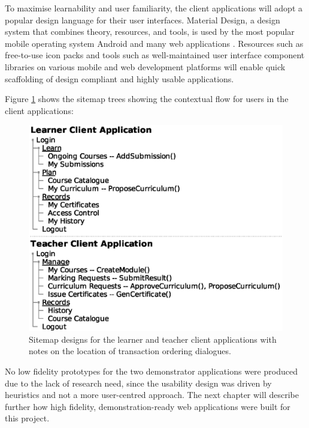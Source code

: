 To maximise learnability and user familiarity, the client applications will adopt a popular design language for their user interfaces.
Material Design, a design system that combines theory, resources, and tools, is used by the most popular mobile operating system Android
and many web applications \citep{google2018material}. Resources such as free-to-use icon packs and tools such as well-maintained
user interface component libraries on various mobile and web development platforms will enable quick scaffolding of design compliant and
highly usable applications.

Figure \ref{fig:sitemaps} shows the sitemap trees showing the contextual flow for users in the client applications:

\begin{figure}[!ht]
	\centering
	\includegraphics[width=.75\textwidth]{sitemaps}
	\caption[Client Application Sitemaps]
	{Sitemap designs for the learner and teacher client applications with notes on the location of transaction ordering dialogues.} \label{fig:sitemaps}
\end{figure}

No low fidelity prototypes for the two demonstrator applications were produced due to the lack of research need,
since the usability design was driven by heuristics and not a more user-centred approach. 
The next chapter will describe further how high fidelity, demonstration-ready web applications were built for this project.